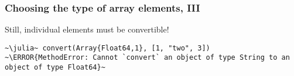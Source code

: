\documentclass[english,serif,mathserif,xcolor=pdftex,dvipsnames,table]{beamer}
\begin{document}
\begin{frame}
  \frametitle{Choosing the type of array elements, III}

  Still, individual elements must be convertible!
\begin{lstlisting}
~\julia~ convert(Array{Float64,1}, [1, "two", 3])
~\ERROR{MethodError: Cannot `convert` an object of type String to an object of type Float64}~

\end{lstlisting}
\end{frame}
\end{document}
